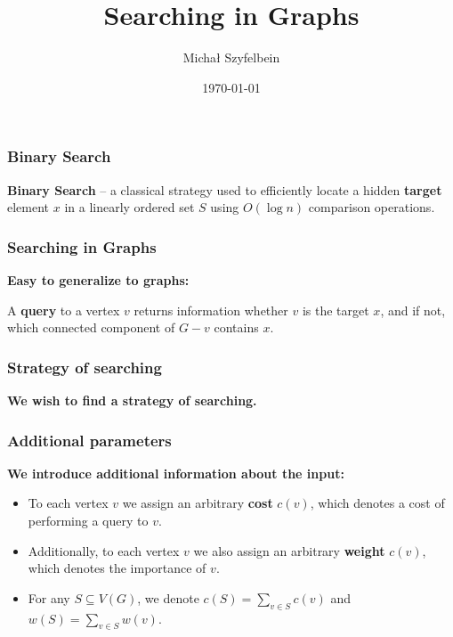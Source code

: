 \documentclass{beamer}
\title{Searching in Graphs
}
\author{Michał Szyfelbein}
\institute{Faculty of Electronics, Telecommunications and Informatics\\Gdańsk University of Technology, Poland}
\date{\today}
\newcommand{\br}[1]{\mathopen{}\left( #1 \right)}
\begin{document}

\usetikzlibrary {graphs,graphdrawing} 

\frame{\titlepage}

\begin{frame}
\frametitle{Binary Search}
\textbf{Binary Search} – a classical strategy used to efficiently locate a hidden \textbf{target} element $x$ in a linearly ordered set $S$ using $O\br{\log n}$ comparison operations.
\pause


\end{frame}

\begin{frame}
\frametitle{Searching in Graphs}
\textbf{Easy to generalize to graphs:} 

A \textbf{query} to a vertex $v$ returns information whether $v$ is the target $x$, and if not, which connected component of $G-v$ contains $x$.
\pause


\end{frame}
\begin{frame}\frametitle{Strategy of searching}

\textbf{We wish to find a strategy of searching.}

\end{frame}

\begin{frame}\frametitle{Additional parameters}
    \textbf{We introduce additional information about the input:}
    \begin{itemize}
        \item 
    To each vertex $v$ we assign an arbitrary \textbf{cost} $c\br{v}$, which denotes a cost of performing a query to $v$.
    \pause
    \item 
    Additionally, to each vertex $v$ we also assign an arbitrary \textbf{weight} $c\br{v}$, which denotes the importance of $v$.
    \pause
    \item For any $S\subseteq V\br{G}$, we denote $c\br{S}=\sum_{v\in S}c\br{v}$ and $w\br{S}=\sum_{v\in S}w\br{v}$.
    \end{itemize}

\end{frame}
\end{document}
